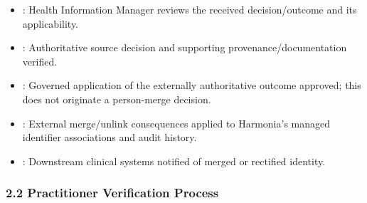 \begin{itemize}
\begin{itemize}
\item 
\texttt{}: Health Information Manager reviews the received decision/\allowbreak{}outcome and its applicability.



\item 
\texttt{}: Authoritative source decision and supporting provenance/\allowbreak{}documentation verified.



\item 
\texttt{}: Governed application of the externally authoritative outcome approved; this does not originate a person-merge decision.



\item 
\texttt{}: External merge/\allowbreak{}unlink consequences applied to Harmonia's managed identifier associations and audit history.



\item 
\texttt{}: Downstream clinical systems notified of merged or rectified identity.



\end{itemize}


\end{itemize}
\label{rad:processes:83}

\par\smallskip
{}\label{rad:processes:85}
\subsubsection*{2.2 Practitioner Verification Process}
\label{rad:processes:86}

